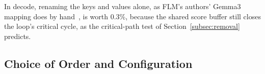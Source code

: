 In decode, renaming the keys and values alone, as FLM's authors' Gemma3 mapping does by hand~\citep{du2026gemma3}, is worth 0.3\%, because the shared score buffer still closes the loop's critical cycle, as the critical-path test of Section~\ref{subsec:removal} predicts.

\subsection{Choice of Order and Configuration}
\label{subsec:decision}

